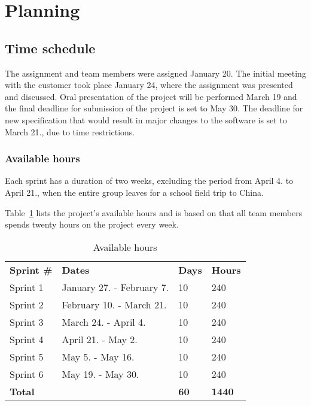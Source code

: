 \section{Planning}
\subsection{Time schedule}
The assignment and team members were assigned January 20. The initial meeting with the customer took place January 24, where the assignment was presented and discussed. Oral presentation of the project will be performed March 19 and the final deadline for submission of the project is set to May 30. The deadline for new specification that would result in major changes to the software is set to March 21., due to time restrictions.

\subsubsection{Available hours}
Each sprint has a duration of two weeks, excluding the period from April 4. to April 21., when the entire group leaves for a school field trip to China.
 
Table~\ref{tab:availHours} lists the project's available hours and is based on  that all team members spends twenty hours on the project every week.

\begin{table}[H]
\centering
{}
\begin{tabular}{|l|l|l|l|}
\hline
\textbf{Sprint \#} & \textbf{Dates} & \textbf{Days} & \textbf{Hours}\\
Sprint 1& January 27. - February 7. & 10  & 240 \\
Sprint 2 & February 10. - March 21. &10  & 240 \\
Sprint 3 & March 24. - April 4. &10 & 240 \\
Sprint 4 & April 21. - May 2. &10  &240 \\
Sprint 5 & May 5. - May 16. &10&  240 \\
Sprint 6 & May 19. - May 30. &10  &240 \\
\textbf{Total}&& \textbf{60}&  \textbf{1440}\\\hline
\end{tabular}
\caption{Available hours}
\label{tab:availHours}
\end{table}

